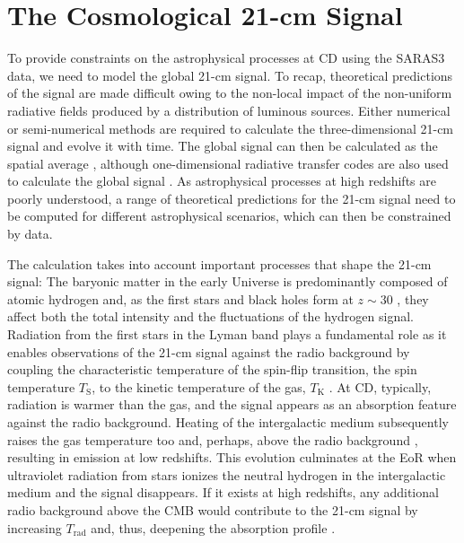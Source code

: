 \section{The Cosmological 21-cm Signal}
\label{sec:modelling_saras3}

To provide constraints on the astrophysical processes at CD using the SARAS3 data, we need to model the global 21-cm signal. To recap, theoretical predictions of the signal are made difficult owing to the non-local impact of the non-uniform radiative fields produced by a distribution of luminous sources. Either numerical or semi-numerical methods are required to calculate the three-dimensional 21-cm signal and evolve it with time. The global signal can then be calculated as the spatial average \cite{Visbal_2012, Fialkov_lyw_2013, Fialkov_rich_2014, fialkov_observable_2014, Reis_sta_2021}, although one-dimensional radiative transfer codes are also used to calculate the global signal \cite{Mirocah:2020}. As astrophysical processes at high redshifts are poorly understood, a range of theoretical predictions for the 21-cm signal need to be computed for different astrophysical scenarios, which can then be constrained by data. 

The calculation takes into account important processes that shape the 21-cm signal: The baryonic matter in the early Universe is predominantly composed of atomic hydrogen and, as the first stars and black holes form at $z\sim 30$ \cite{Fialkov2012, Klessen2019}, they affect both the total intensity and the fluctuations of the hydrogen signal. Radiation from the first stars in the Lyman band plays a fundamental role as it enables observations of the 21-cm signal against the radio background by coupling the characteristic temperature of the spin-flip transition, the spin temperature $T_\mathrm{S}$, to the kinetic temperature of the gas, $T_\mathrm{K}$ \cite{Wouthuysen1952, Field1959}. At CD, typically, radiation is warmer than the gas, and the signal appears as an absorption feature against the radio background. Heating of the intergalactic medium subsequently raises the gas temperature too and, perhaps, above the radio background \cite{Fialkov_rich_2014, fialkov_observable_2014, Reis_sta_2021}, resulting in emission at low redshifts. This evolution culminates at the EoR when ultraviolet radiation from stars ionizes the neutral hydrogen in the intergalactic medium and the signal disappears. If it exists at high redshifts, any additional radio background above the CMB would contribute to the 21-cm signal by increasing $T_\mathrm{rad}$ and, thus, deepening the absorption profile \cite{FengRB2018, EwallRB2018, MirochaRB2019,Fialkov2019, Reis2020}.

